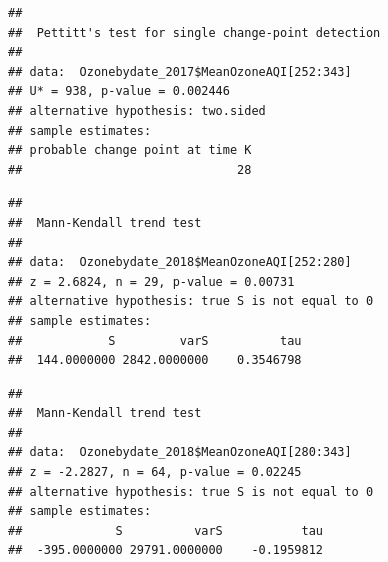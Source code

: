 \documentclass[12pt,]{article}
\newenvironment{Shaded}{\begin{snugshade}}{\end{snugshade}}
\newcommand{\KeywordTok}[1]{\textcolor[rgb]{0.13,0.29,0.53}{\textbf{#1}}}
\newcommand{\DecValTok}[1]{\textcolor[rgb]{0.00,0.00,0.81}{#1}}
\newcommand{\CommentTok}[1]{\textcolor[rgb]{0.56,0.35,0.01}{\textit{#1}}}
\newcommand{\OperatorTok}[1]{\textcolor[rgb]{0.81,0.36,0.00}{\textbf{#1}}}
\newcommand{\NormalTok}[1]{#1}
\begin{document}
\begin{Shaded}
\end{Shaded}

\begin{verbatim}
## 
##  Pettitt's test for single change-point detection
## 
## data:  Ozonebydate_2017$MeanOzoneAQI[252:343]
## U* = 938, p-value = 0.002446
## alternative hypothesis: two.sided
## sample estimates:
## probable change point at time K 
##                              28
\end{verbatim}

\begin{Shaded}
\end{Shaded}

\begin{verbatim}
## 
##  Mann-Kendall trend test
## 
## data:  Ozonebydate_2018$MeanOzoneAQI[252:280]
## z = 2.6824, n = 29, p-value = 0.00731
## alternative hypothesis: true S is not equal to 0
## sample estimates:
##            S         varS          tau 
##  144.0000000 2842.0000000    0.3546798
\end{verbatim}

\begin{Shaded}
\end{Shaded}

\begin{verbatim}
## 
##  Mann-Kendall trend test
## 
## data:  Ozonebydate_2018$MeanOzoneAQI[280:343]
## z = -2.2827, n = 64, p-value = 0.02245
## alternative hypothesis: true S is not equal to 0
## sample estimates:
##             S          varS           tau 
##  -395.0000000 29791.0000000    -0.1959812
\end{verbatim}
\end{document}
